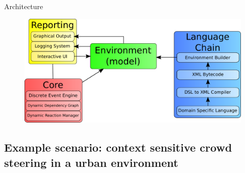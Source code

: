 \documentclass[presentation]{beamer} %
\begin{document}
\begin{frame}{Architecture}
  \begin{figure}
    \includegraphics[width=\textwidth]{imgs/architecture} 
  \end{figure}
\end{frame}


\subsection{Example scenario: context sensitive crowd steering in a urban environment}
\end{document}
